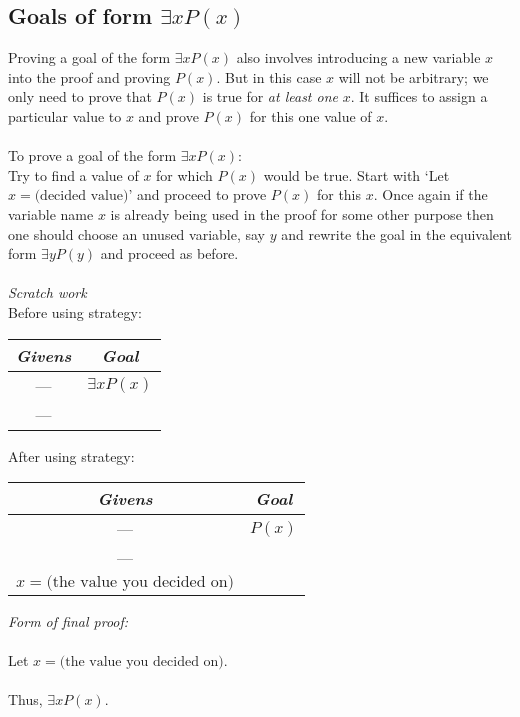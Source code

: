 \documentclass{report}
\theoremstyle{definition}
\begin{document}
\subsection{Goals of form $\exists xP(x)$}
Proving a goal of the form $\exists xP(x)$ also involves introducing a new variable $x$ into the proof and proving $P(x)$. But in this case $x$ will not be arbitrary; we only need to prove that 
$P(x)$ is true for \textit{at least one} $x$. It suffices to assign a particular value to $x$ and prove $P(x)$ for this one value of $x$.\\
\vspace{1mm}\\
\indent To prove a goal of the form $\exists xP(x)$:\\
\indent Try to find a value of $x$ for which $P(x)$ would be true. Start with `Let $x=\text{(decided value)}$' and proceed to prove $P(x)$ for this $x$. Once again if the variable name $x$ 
is already being used in the proof for some other purpose then one should choose an unused variable, say $y$ and rewrite the goal in the equivalent form $\exists yP(y)$ and proceed as before.\\
\vspace{1mm}\\
\textit{Scratch work}\\
Before using strategy:
\begin{center}
\begin{tabular}{c|c}
\textit{Givens}&\textit{Goal}\\
\hline
---&$\exists xP(x)$\\
---&
\end{tabular}
\end{center}
After using strategy:
\begin{center}
\begin{tabular}{c|c}
\textit{Givens}&\textit{Goal}\\
\hline
---&$P(x)$\\
---&\\
$x=\text{(the value you decided on)}$&
\end{tabular}
\end{center}
\textit{Form of final proof:}\\
\vspace{1mm}\\
\indent Let $x=\text{(the value you decided on)}$.\\
\indent{}\\
\indent Thus, $\exists xP(x)$.\\
\end{document}

